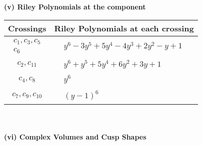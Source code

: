 \documentclass[1p]{elsarticle_modified}
\theoremstyle{definition}
\begin{document}
\newpage\renewcommand{\arraystretch}{1}
\flushleft \textbf{(v) Riley Polynomials at the component}\newline \\
\begin{tabular}{m{50pt}|m{274pt}}
Crossings & \hspace{64pt}Riley Polynomials at each crossing \\
\hline $$\begin{aligned}c_{1},c_{3},c_{5}\\c_{6}\end{aligned}$$&$\begin{aligned}
&y^6-3 y^5+5 y^4-4 y^3+2 y^2- y+1
\end{aligned}$\\
\hline $$\begin{aligned}c_{2},c_{11}\end{aligned}$$&$\begin{aligned}
&y^6+y^5+5 y^4+6 y^2+3 y+1
\end{aligned}$\\
\hline $$\begin{aligned}c_{4},c_{8}\end{aligned}$$&$\begin{aligned}
&y^6
\end{aligned}$\\
\hline $$\begin{aligned}c_{7},c_{9},c_{10}\end{aligned}$$&$\begin{aligned}
&(y-1)^6
\end{aligned}$\\
\hline
\end{tabular}\\~\\
\newpage\flushleft \textbf{(vi) Complex Volumes and Cusp Shapes}
\end{document}

